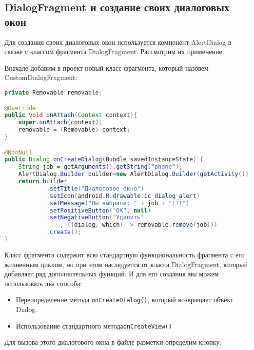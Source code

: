 \subsection{DialogFragment и создание своих диалоговых окон}
Для создания своих диалоговых окон используется компонент AlertDialog в
связке с классом фрагмента DialogFragment. Рассмотрим их применение.\par
Вначале добавим в проект новый класс фрагмента, который назовем
CustomDialogFragment:

\begin{lstlisting}[language=Java
	, label=lst:
	]
private Removable removable;

@Override
public void onAttach(Context context){
	super.onAttach(context);
	removable = (Removable) context;
}

@NonNull
public Dialog onCreateDialog(Bundle savedInstanceState) {
	String job = getArguments().getString("phone");
	AlertDialog.Builder builder=new AlertDialog.Builder(getActivity());
	return builder
			.setTitle("Диалоговое окно")
			.setIcon(android.R.drawable.ic_dialog_alert)
			.setMessage("Вы выбрали: " + job + "!!!")
			.setPositiveButton("OK", null)
			.setNegativeButton("Удалить"
				, ((dialog, which) -> removable.remove(job)))
			.create();
}
\end{lstlisting}

Класс фрагмента содержит всю стандартную функциональность фрагмента с
его жизненным циклом, но при этом наследуется от класса DialogFragment,
который добавляет ряд дополнительных функций. И для его создания мы
можем использовать два способа:

\begin{itemize}
	\item Переопределение метода \texttt{onCreateDialog()}, который возвращает
		объект Dialog.
	\item Использование стандартного метода\texttt{onCreateView()} 
\end{itemize}

Для вызова этого диалогового окна в файле разметки определим
кнопку:

